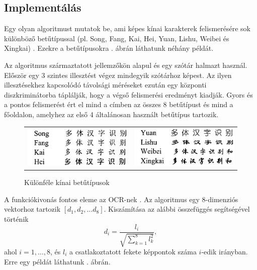 \subsection{Implementálás}

Egy olyan algoritmust mutatok be, ami képes kínai karakterek felismerésére sok különböző betűtípussal (pl. Song, Fang, Kai, Hei, Yuan, Lishu, Weibei és Xingkai) \cite{wu2002recognition}. Ezekre a betűtípusokra . ábrán láthatunk néhány példát.

Az algoritmus származtatott jellemzőkön alapul és egy szótár halmazt használ. Először egy 3 szintes illesztést végez mindegyik szótárhoz képest. Az ilyen illesztésekhez kapcsolódó távolsági méréseket ezután egy központi diszkriminátorba táplálják, hogy a végső felismerési eredményt kiadják. Gyors és a pontos felismerést ért el mind a címben az összes 8 betűtípust és mind a főoldalon, amelyhez az első 4 általánosan használt betűtípus tartozik.

\begin{figure}[h]
\centering
\begin{tabular}{ c c }
\includegraphics[scale=0.35]{images/chinese_fonts1} & \includegraphics[scale=0.35]{images/chinese_fonts2}
\end{tabular}
\caption{Különféle kínai betűtípusok}
\label{fig:chinese_fonts}
\end{figure}

A funkciókivonás fontos eleme az OCR-nek \cite{wu2002recognition}. Az algoritmus egy 8-dimenziós vektorhoz tartozik $[d_1, d_2, \ldots d_8]$. Kiszámítása az alábbi összefüggés segítségével történik
$$
d_i = \dfrac{l_i}{\sqrt{\displaystyle \sum_{k=1}^8 l_k^2}},
$$
ahol $i = 1, \ldots, 8$, és $l_i$ a csatlakoztatott fekete képpontok száma $i$-edik irányban. Erre egy példát láthatunk . ábrán.

